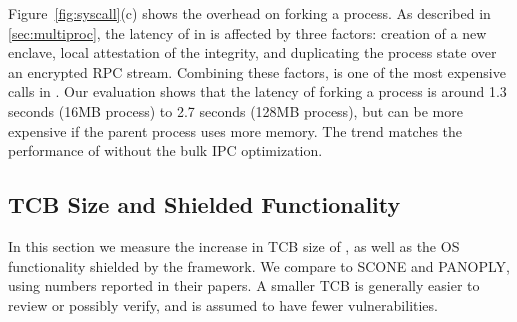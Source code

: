 Figure~\ref{fig:syscall}(c) shows the overhead on forking a process.
As described in \ref{sec:multiproc}, the latency of  in \graphenesgx{} is affected by three factors:
creation of a new enclave, local attestation of the integrity, and duplicating the process state over an encrypted RPC stream.
Combining these factors,  is one of the most expensive calls in \graphenesgx{}.
Our evaluation shows that the latency of forking a process is around 1.3 seconds (16MB process) to 2.7 seconds (128MB process), but can be more expensive if the parent process uses more memory.
The trend matches the performance of \graphene{} without the bulk IPC optimization.




\subsection{TCB Size and Shielded Functionality}

In this section we measure the increase in TCB size of \graphenesgx{},
as well as 
the OS functionality shielded by the framework.
We compare to SCONE{} and PANOPLY, using
numbers reported in their papers. 
A smaller TCB is generally easier to review or possibly verify,
and is assumed to have fewer vulnerabilities.


